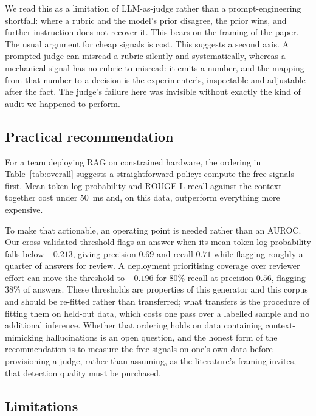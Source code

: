 \documentclass[11pt,a4paper]{article}
\begin{document}
We read this as a limitation of LLM-as-judge rather than a prompt-engineering
shortfall: where a rubric and the model's prior disagree, the prior wins, and
further instruction does not recover it. This bears on the framing of the paper.
The usual argument for cheap signals is cost. This suggests a second axis. A
prompted judge can misread a rubric silently and systematically, whereas a
mechanical signal has no rubric to misread: it emits a number, and the mapping
from that number to a decision is the experimenter's, inspectable and adjustable
after the fact. The judge's failure here was invisible without exactly the kind
of audit we happened to perform.

\subsection{Practical recommendation}

For a team deploying RAG on constrained hardware, the ordering in
Table~\ref{tab:overall} suggests a straightforward policy: compute the free
signals first. Mean token log-probability and ROUGE-L recall against the context
together cost under \SI{50}{\milli\second} and, on this data, outperform
everything more expensive.

To make that actionable, an operating point is needed rather than an AUROC. Our
cross-validated threshold flags an answer when its mean token log-probability
falls below $-0.213$, giving precision $0.69$ and recall $0.71$ while flagging
roughly a quarter of answers for review. A deployment prioritising coverage over
reviewer effort can move the threshold to $-0.196$ for $80\%$ recall at
precision $0.56$, flagging $38\%$ of answers. These thresholds are properties of
this generator and this corpus and should be re-fitted rather than transferred;
what transfers is the procedure of fitting them on held-out data, which costs
one pass over a labelled sample and no additional inference. Whether that ordering holds on data containing
context-mimicking hallucinations is an open question, and the honest form of the
recommendation is to measure the free signals on one's own data before
provisioning a judge, rather than assuming, as the literature's framing invites, that
detection quality must be purchased.

\subsection{Limitations}
\end{document}
